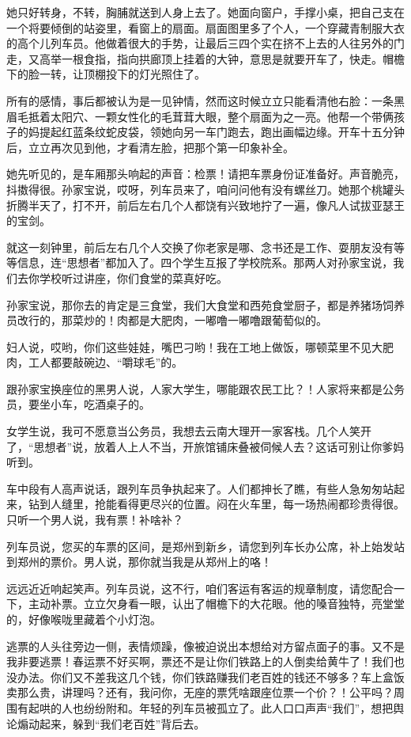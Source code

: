 \documentclass[lang=cn,newtx,12pt,scheme=chinese]{elegantbook}
\begin{document}
她只好转身，不转，胸脯就送到人身上去了。她面向窗户，手撑小桌，把自己支在一个将要倾倒的站姿里，看窗上的扇面。扇面图里多了个人，一个穿藏青制服大衣的高个儿列车员。他做着很大的手势，让最后三四个实在挤不上去的人往另外的门走，又高举一根食指，指向拱廊顶上挂着的大钟，意思是就要开车了，快走。帽檐下的脸一转，让顶棚投下的灯光照住了。

所有的感情，事后都被认为是一见钟情，然而这时候立立只能看清他右脸：一条黑眉毛抵着太阳穴、一颗女性化的毛茸茸大眼，整个扇面为之一亮。他帮一个带俩孩子的妈提起红蓝条纹蛇皮袋，领她向另一车门跑去，跑出画幅边缘。开车十五分钟后，立立再次见到他，才看清左脸，把那个第一印象补全。

她先听见的，是车厢那头响起的声音：检票！请把车票身份证准备好。声音脆亮，抖擞得很。孙家宝说，哎呀，列车员来了，咱问问他有没有螺丝刀。她那个桃罐头折腾半天了，打不开，前后左右几个人都饶有兴致地拧了一遍，像凡人试拔亚瑟王的宝剑。

就这一刻钟里，前后左右几个人交换了你老家是哪、念书还是工作、耍朋友没有等等信息，连“思想者”都加入了。四个学生互报了学校院系。那两人对孙家宝说，我们去你学校听过讲座，你们食堂的菜真好吃。

孙家宝说，那你去的肯定是三食堂，我们大食堂和西苑食堂厨子，都是养猪场饲养员改行的，那菜炒的！肉都是大肥肉，一嘟噜一嘟噜跟葡萄似的。

妇人说，哎哟，你们这些娃娃，嘴巴刁哟！我在工地上做饭，哪顿菜里不见大肥肉，工人都要敲碗边、“嚼球毛”的。

跟孙家宝换座位的黑男人说，人家大学生，哪能跟农民工比？！人家将来都是公务员，要坐小车，吃酒桌子的。

女学生说，我可不愿意当公务员，我想去云南大理开一家客栈。几个人笑开了，“思想者”说，放着人上人不当，开旅馆铺床叠被伺候人去？这话可别让你爹妈听到。

车中段有人高声说话，跟列车员争执起来了。人们都抻长了瞧，有些人急匆匆站起来，钻到人缝里，抢能看得更尽兴的位置。闷在火车里，每一场热闹都珍贵得很。只听一个男人说，我有票！补啥补？

列车员说，您买的车票的区间，是郑州到新乡，请您到列车长办公席，补上始发站到郑州的票价。男人说，那你就当我是从郑州上的咯！

远远近近响起笑声。列车员说，这不行，咱们客运有客运的规章制度，请您配合一下，主动补票。立立欠身看一眼，认出了帽檐下的大花眼。他的嗓音独特，亮堂堂的，好像喉咙里藏着个小灯泡。

逃票的人头往旁边一侧，表情烦躁，像被迫说出本想给对方留点面子的事。又不是我非要逃票！春运票不好买啊，票还不是让你们铁路上的人倒卖给黄牛了！我们也没办法。你们又不差我这几个钱，你们铁路赚我们老百姓的钱还不够多？车上盒饭卖那么贵，讲理吗？还有，我问你，无座的票凭啥跟座位票一个价？！公平吗？周围有起哄的人也纷纷附和。年轻的列车员被孤立了。此人口口声声“我们”，想把舆论煽动起来，躲到“我们老百姓”背后去。
\end{document}
